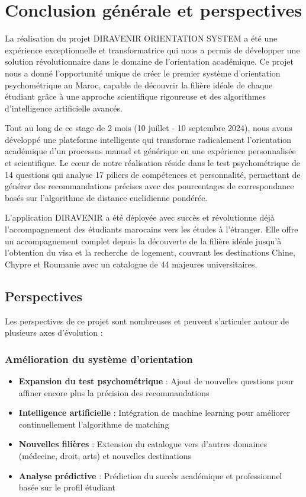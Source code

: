 \documentclass[12pt,a4paper]{report}
\begin{document}
\chapter*{Conclusion générale et perspectives}

La réalisation du projet DIRAVENIR ORIENTATION SYSTEM a été une expérience exceptionnelle et transformatrice qui nous a permis de développer une solution révolutionnaire dans le domaine de l'orientation académique. Ce projet nous a donné l'opportunité unique de créer le premier système d'orientation psychométrique au Maroc, capable de découvrir la filière idéale de chaque étudiant grâce à une approche scientifique rigoureuse et des algorithmes d'intelligence artificielle avancés.

Tout au long de ce stage de 2 mois (10 juillet - 10 septembre 2024), nous avons développé une plateforme intelligente qui transforme radicalement l'orientation académique d'un processus manuel et générique en une expérience personnalisée et scientifique. Le cœur de notre réalisation réside dans le test psychométrique de 14 questions qui analyse 17 piliers de compétences et personnalité, permettant de générer des recommandations précises avec des pourcentages de correspondance basés sur l'algorithme de distance euclidienne pondérée.

L'application DIRAVENIR a été déployée avec succès et révolutionne déjà l'accompagnement des étudiants marocains vers les études à l'étranger. Elle offre un accompagnement complet depuis la découverte de la filière idéale jusqu'à l'obtention du visa et la recherche de logement, couvrant les destinations Chine, Chypre et Roumanie avec un catalogue de 44 majeures universitaires.

\section{Perspectives}

Les perspectives de ce projet sont nombreuses et peuvent s'articuler autour de plusieurs axes d'évolution :

\subsection{Amélioration du système d'orientation}

\begin{itemize}
    \item \textbf{Expansion du test psychométrique} : Ajout de nouvelles questions pour affiner encore plus la précision des recommandations
    \item \textbf{Intelligence artificielle} : Intégration de machine learning pour améliorer continuellement l'algorithme de matching
    \item \textbf{Nouvelles filières} : Extension du catalogue vers d'autres domaines (médecine, droit, arts) et nouvelles destinations
    \item \textbf{Analyse prédictive} : Prédiction du succès académique et professionnel basée sur le profil étudiant
\end{itemize}
\end{document}
